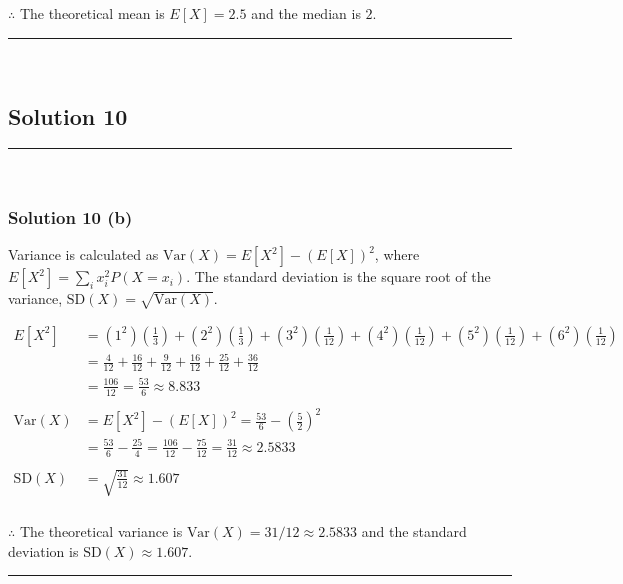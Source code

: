 \documentclass{article}
\begin{document}
\subsubsection*{\normalfont}{$\therefore$ The theoretical mean is $E[X] = 2.5$ and the median is $2$.}

\noindent\rule{\textwidth}{0.4pt}\\

\newpage

\subsection*{Solution 10}
\noindent\rule{\textwidth}{0.4pt}\\
\subsubsection*{Solution  10 (b)}

\parbox{\textwidth}{Variance is calculated as $\text{Var}(X) = E[X^2] - (E[X])^2$, where $E[X^2] = \sum_{i} x_i^2 P(X=x_i)$. The standard deviation is the square root of the variance, $\text{SD}(X) = \sqrt{\text{Var}(X)}$.}
\begin{align*}
E[X^2] &= (1^2)\left(\frac{1}{3}\right) + (2^2)\left(\frac{1}{3}\right) + (3^2)\left(\frac{1}{12}\right) + (4^2)\left(\frac{1}{12}\right) + (5^2)\left(\frac{1}{12}\right) + (6^2)\left(\frac{1}{12}\right) \\
&= \frac{4}{12} + \frac{16}{12} + \frac{9}{12} + \frac{16}{12} + \frac{25}{12} + \frac{36}{12} \\
&= \frac{106}{12} = \frac{53}{6} \approx 8.833 \\
\\
\text{Var}(X) &= E[X^2] - (E[X])^2 = \frac{53}{6} - \left(\frac{5}{2}\right)^2 \\
&= \frac{53}{6} - \frac{25}{4} = \frac{106}{12} - \frac{75}{12} = \frac{31}{12} \approx 2.5833 \\
\\
\text{SD}(X) &= \sqrt{\frac{31}{12}} \approx 1.607
\end{align*}
\subsubsection*{\normalfont}{$\therefore$ The theoretical variance is $\text{Var}(X) = 31/12 \approx 2.5833$ and the standard deviation is $\text{SD}(X) \approx 1.607$.}


\noindent\rule{\textwidth}{0.4pt}\\
\end{document}
